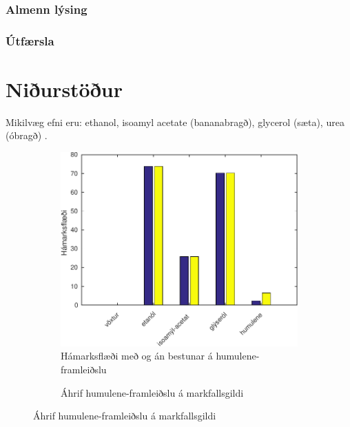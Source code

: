 \documentclass[12pt]{article}
\begin{document}
\subsubsection{Almenn lýsing}
\subsubsection{Útfærsla}

\section{Niðurstöður}

Mikilvæg efni eru: ethanol, isoamyl acetate (bananabragð), glycerol (sæta), urea (óbragð) \cite{dequin2001potential}.


\begin{figure}
\caption[Áhrif humulene á hefðbundna gerjun]{Yfirlit yfir áhrif humulene-framleiðslu á hefðbundna gerjun}
\centering
\begin{subfigure}[b]{0.45\textwidth}
\caption{Hámarksflæði með og án bestunar á humulene-framleiðslu}
\includegraphics[width=\textwidth]{Pics/BrewingMetMaxFlow}
\end{subfigure}
\hspace{0.5cm}
\begin{subfigure}[b]{0.45\textwidth}
\caption{Áhrif humulene-framleiðslu á markfallsgildi}

\end{subfigure}
\end{figure}
\end{document}
